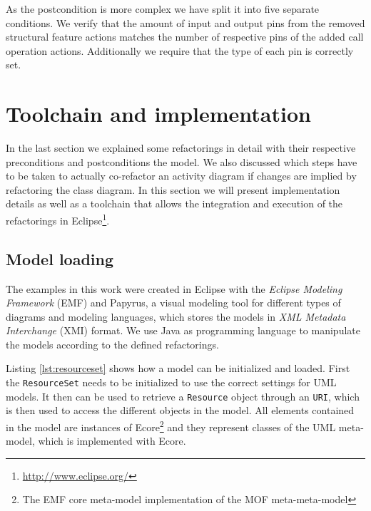 \documentclass{llncs}
\begin{document}
As the postcondition is more complex we have split it into five separate conditions. We verify that the amount of input and output 
pins from the removed structural feature actions matches the number of respective pins of the added call operation actions. Additionally
we require that the type of each pin is correctly set.


\clearpage
\section{Toolchain and implementation}
\label{sec:toolchain}
In the last section we explained some refactorings in detail with their respective preconditions and postconditions the model. 
We also discussed which steps have to be taken to actually co-refactor an activity diagram if changes are implied by refactoring 
the class diagram. In this section we will present implementation details as well as a toolchain that allows the integration and 
execution of the refactorings in Eclipse\footnote{\url{http://www.eclipse.org/}}.

\subsection{Model loading}
The examples in this work were created in Eclipse with the \textit{Eclipse Modeling Framework} \cite{Steinberg:2009:EEM:1197540} 
(EMF) and Papyrus, a visual modeling tool for different types of diagrams and modeling languages, which stores the models 
in \textit{XML Metadata Interchange} \cite{man:XMI} (XMI) format. We use Java as programming language to manipulate 
the models according to the defined refactorings.

Listing \ref{lst:resourceset} shows how a model can be initialized and loaded. First the \texttt{Resource\-Set} needs to be 
initialized to use the correct settings for UML models. It then can be used to retrieve a \texttt{Resource} object through 
an \texttt{URI}, which is then used to access the different objects in the model. 
All elements contained in the model are instances of Ecore\footnote{The EMF core meta-model implementation of
the MOF meta-meta-model} and they represent classes of the UML meta-model, which is implemented with Ecore.
\end{document}
